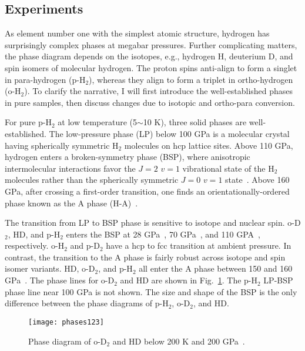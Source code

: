 \subsection{Experiments}
\label{sec:hsolid-expt}

As element number one with the simplest atomic structure, hydrogen has surprisingly complex phases at megabar pressures.
Further complicating matters, the phase diagram depends on the isotopes, e.g., hydrogen H, deuterium D, and spin isomers of molecular hydrogen.
The proton spins anti-align to form a singlet in para-hydrogen (p-H$_2$), whereas they align to form a triplet in ortho-hydrogen (o-H$_2$).
To clarify the narrative, I will first introduce the well-established phases in pure samples, then discuss changes due to isotopic and ortho-para conversion.

For pure p-H$_2$ at low temperature (5$\sim$10 K), three solid phases are well-established. The low-pressure phase (LP) below 100 GPa is a molecular crystal having spherically symmetric H$_2$ molecules on hcp lattice sites. Above 110 GPa, hydrogen enters a broken-symmetry phase (BSP), where anisotropic intermolecular interactions favor the $J=2$ $v=1$ vibrational state of the H$_2$ molecules rather than the spherically symmetric $J=0$ $v=1$ state~\cite{Lorenzana1990}. Above 160 GPa, after crossing a first-order transition, one finds an orientationally-ordered phase known as the A phase (H-A)~\cite{Lorenzana1989}.

The transition from LP to BSP phase is sensitive to isotope and nuclear spin. o-D$_2$, HD, and p-H$_2$ enters the BSP at 28 GPa~\cite{Silvera1981}, 70 GPa~\cite{Chijioke2006}, and 110 GPA~\cite{Lorenzana1990}, respectively. o-H$_2$ and p-D$_2$ have a hcp to fcc transition at ambient pressure. In contrast, the transition to the A phase is fairly robust across isotope and spin isomer variants. HD, o-D$_2$, and p-H$_2$ all enter the A phase between 150 and 160 GPa~\cite{Hemley1988,Lorenzana1989,Cui1994,Chijioke2006}. The phase lines for o-D$_2$ and HD are shown in Fig.~\ref{fig:hsolid-phases123}. The p-H$_2$ LP-BSP phase line near 100 GPa is not shown. The size and shape of the BSP is the only difference between the phase diagrams of p-H$_2$, o-D$_2$, and HD.

\begin{figure}[h]
\centering
\texttt{[image: phases123]}
\caption{Phase diagram of o-D$_2$ and HD below 200 K and 200 GPa~\cite{Chijioke2006}.}
\label{fig:hsolid-phases123}
\end{figure}

